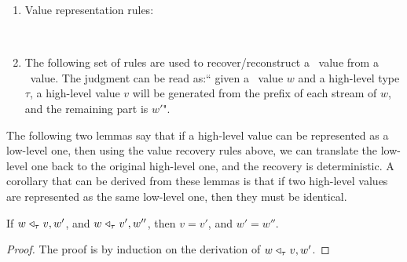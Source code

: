 \begin{enumerate}[(1)]
\item Value representation rules: \\
	
		
		\\
		
	


\item The following set of rules are used to recover/reconstruct a \fmsnesl \ value from a \fmsvcode\ value. The judgment can be read as:`` given a \fmsvcode\ value $w$ and a high-level type $\tau$, a high-level value $v$ will be generated from the prefix of each stream of $w$, and the remaining part is $w'$". \\

\end{enumerate}


The following two lemmas say that if a high-level value can be represented as a low-level one, then using the value recovery rules above, we can translate the low-level one back to the original high-level one, and the recovery is deterministic.
A corollary that can be derived from these lemmas is that if two high-level values are represented as the same low-level one, then they must be identical.


\begin{lem} \label{lem:recov-determ}
	If $w \mathrel{\triangleleft_{\tau}} v,w'$, and $w \mathrel{\triangleleft_{\tau}} v',w''$,
	then $v = v'$, and $w' = w'' $.
\end{lem}
\begin{proof}
	The proof is by induction on the derivation of $w \mathrel{\triangleleft_{\tau}} v,w'$.
\end{proof}


